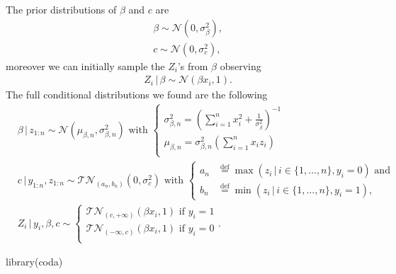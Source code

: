 \documentclass[
  11pt,
]{article}
\newenvironment{Shaded}{\begin{snugshade}}{\end{snugshade}}
\newcommand{\FunctionTok}[1]{\textcolor[rgb]{0.00,0.00,0.00}{#1}}
\newcommand{\NormalTok}[1]{#1}
\begin{document}
The prior distributions of \(\beta\) and \(c\) are \begin{align*}
    & \beta \sim \mathcal{N}\left(0,\sigma_\beta^2\right), \\
    & c \sim \mathcal{N}\left(0,\sigma_c^2\right),
\end{align*} moreover we can initially sample the \(Z_i\)'s from
\(\beta\) observing \begin{align*}
    & Z_i \,|\,\beta \sim \mathcal{N}\left(\beta x_i,1\right).
\end{align*} The full conditional distributions we found are the
following \begin{align*}
    & \beta \,|\,z_{1:n} \sim \mathcal{N}\left(\mu_{\beta, n},\sigma_{\beta, n}^2\right) \text{ with } 
        \begin{cases}
            \displaystyle \sigma_{\beta, n}^2 = \left(\sum_{i = 1}^{n} x_i^2 + \frac{1}{\sigma_\beta^2}\right)^{-1} \\
            \displaystyle \mu_{\beta, n} = \sigma_{\beta, n}^2 \left(\sum_{i = 1}^{n} x_i z_i \right) \\
        \end{cases} \\
    & c \,|\,y_{1:n}, z_{1:n} \sim \mathcal{T}\mathcal{N}_{(a_n, b_n)}\left(0,\sigma_c^2\right) \text{ with }
        \begin{cases}
            \displaystyle a_n & \stackrel{\text{def}}{=}\max\left(z_i \,|\,i \in \{1, \dots, n\}, y_i = 0\right) \text{ and } \\
            \displaystyle b_n & \stackrel{\text{def}}{=}\min\left(z_i \,|\,i \in \{1, \dots, n\}, y_i = 1\right),
        \end{cases} \\
    & Z_i \,|\,y_{i}, \beta, c \sim 
        \begin{cases}
            \displaystyle \mathcal{T}\mathcal{N}_{(c, +\infty)}\left(\beta x_i,1\right) \text{ if } y_i = 1 \\
            \displaystyle\mathcal{T}\mathcal{N}_{(-\infty, c)}\left(\beta x_i,1\right) \text{ if } y_i = 0 \\
        \end{cases}.
\end{align*}

\scriptsize

\begin{Shaded}
\begin{Highlighting}[]
\FunctionTok{library}\NormalTok{(coda)}
\end{Highlighting}
\end{Shaded}
\end{document}
